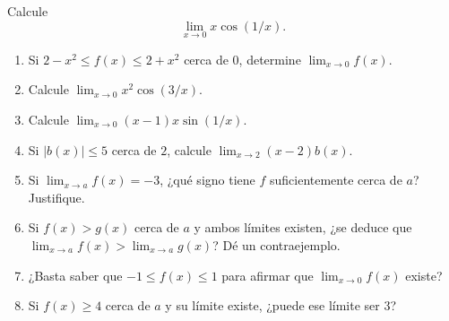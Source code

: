 \documentclass[10pt,a5paper]{article}
\newif\ifmostrarSoluciones
\begin{document}
\begin{ejemplo}
Calcule
\[
  \lim_{x\to0}x\cos(1/x).
\]
\end{ejemplo}
\ifmostrarSoluciones
\begin{solucion}
Como
\[
  |\cos(1/x)|\leq1,
\]
al multiplicar por $|x|\geq0$ obtenemos
\[
  |x\cos(1/x)|
  =|x|\,|\cos(1/x)|
  \leq |x|.
\]
Por tanto,
\[
  -|x|
  \leq x\cos(1/x)
  \leq |x|.
\]
Como
\[
  \lim_{x\to0}-|x|
  =\lim_{x\to0}|x|
  =0,
\]
el teorema del Sanduche permite concluir que
\[
  \lim_{x\to0}x\cos(1/x)=0.
\]
Usar $|x|$ evita invertir incorrectamente las desigualdades cuando $x<0$.
\end{solucion}
\else\vspace{15mm}\fi

\begin{ejercicios}
\begin{enumerate}
  \item Si $2-x^2\leq f(x)\leq2+x^2$ cerca de $0$, determine $\displaystyle\lim_{x\to0}f(x)$.
  \item Calcule $\displaystyle\lim_{x\to0}x^2\cos(3/x)$.
  \item Calcule $\displaystyle\lim_{x\to0}(x-1)x\sin(1/x)$.
  \item Si $|b(x)|\leq5$ cerca de $2$, calcule $\displaystyle\lim_{x\to2}(x-2)b(x)$.
  \item Si $\displaystyle\lim_{x\to a}f(x)=-3$, ¿qué signo tiene $f$ suficientemente cerca de $a$? Justifique.
  \item Si $f(x)>g(x)$ cerca de $a$ y ambos límites existen, ¿se deduce que $\displaystyle\lim_{x\to a}f(x)>\displaystyle\lim_{x\to a}g(x)$? Dé un contraejemplo.
  \item ¿Basta saber que $-1\leq f(x)\leq1$ para afirmar que $\displaystyle\lim_{x\to0}f(x)$ existe?
  \item Si $f(x)\geq4$ cerca de $a$ y su límite existe, ¿puede ese límite ser $3$?
\end{enumerate}
\end{ejercicios}
\end{document}
